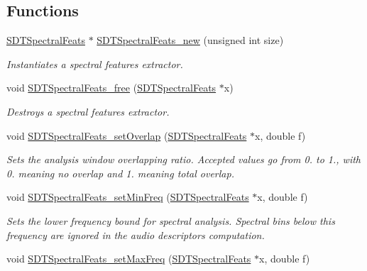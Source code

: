 \subsection*{Functions}
\begin{DoxyCompactItemize}
\item 
\hyperlink{group__spectralfeats_ga92a20692ab1920ebf580c87a45285d4b}{S\+D\+T\+Spectral\+Feats} $\ast$ \hyperlink{group__spectralfeats_ga7d1f2beebf0219377016b4e1a120ad9e}{S\+D\+T\+Spectral\+Feats\+\_\+new} (unsigned int size)
\begin{DoxyCompactList}\small\item\em Instantiates a spectral features extractor. \end{DoxyCompactList}\item 
void \hyperlink{group__spectralfeats_ga43c22dcd6dcdec53a7fa8f2c277e2120}{S\+D\+T\+Spectral\+Feats\+\_\+free} (\hyperlink{group__spectralfeats_ga92a20692ab1920ebf580c87a45285d4b}{S\+D\+T\+Spectral\+Feats} $\ast$x)
\begin{DoxyCompactList}\small\item\em Destroys a spectral features extractor. \end{DoxyCompactList}\item 
void \hyperlink{group__spectralfeats_gad410c59f8895ee4f504505dd6fe8dc3c}{S\+D\+T\+Spectral\+Feats\+\_\+set\+Overlap} (\hyperlink{group__spectralfeats_ga92a20692ab1920ebf580c87a45285d4b}{S\+D\+T\+Spectral\+Feats} $\ast$x, double f)
\begin{DoxyCompactList}\small\item\em Sets the analysis window overlapping ratio. Accepted values go from 0. to 1., with 0. meaning no overlap and 1. meaning total overlap. \end{DoxyCompactList}\item 
void \hyperlink{group__spectralfeats_ga6b0511211ad0aa2a49409bc881a74df3}{S\+D\+T\+Spectral\+Feats\+\_\+set\+Min\+Freq} (\hyperlink{group__spectralfeats_ga92a20692ab1920ebf580c87a45285d4b}{S\+D\+T\+Spectral\+Feats} $\ast$x, double f)
\begin{DoxyCompactList}\small\item\em Sets the lower frequency bound for spectral analysis. Spectral bins below this frequency are ignored in the audio descriptors computation. \end{DoxyCompactList}\item 
void \hyperlink{group__spectralfeats_ga6aaec8acdf52f62715c1622b325eec82}{S\+D\+T\+Spectral\+Feats\+\_\+set\+Max\+Freq} (\hyperlink{group__spectralfeats_ga92a20692ab1920ebf580c87a45285d4b}{S\+D\+T\+Spectral\+Feats} $\ast$x, double f)

\end{DoxyCompactItemize}
